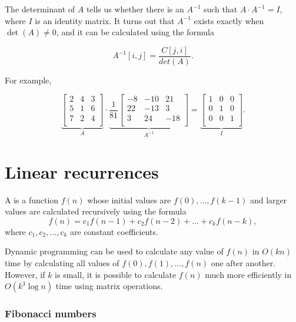 
The determinant of $A$ tells us
whether there is an 
$A^{-1}$ such that $A \cdot A^{-1} = I$,
where $I$ is an identity matrix.
It turns out that $A^{-1}$ exists
exactly when $\det(A) \neq 0$,
and it can be calculated using the formula

\[A^{-1}[i,j] = \frac{C[j,i]}{det(A)}.\]

For example,

\[
    \underbrace{
        \begin{bmatrix}
            2 & 4 & 3 \\
            5 & 1 & 6 \\
            7 & 2 & 4 \\
        \end{bmatrix}
    }_{A}
    \cdot
    \underbrace{
        \frac{1}{81}
        \begin{bmatrix}
            -8 & -10 & 21  \\
            22 & -13 & 3   \\
            3  & 24  & -18 \\
        \end{bmatrix}
    }_{A^{-1}}
    =
    \underbrace{
        \begin{bmatrix}
            1 & 0 & 0 \\
            0 & 1 & 0 \\
            0 & 0 & 1 \\
        \end{bmatrix}
    }_{I}.
\]

\section{Linear recurrences}


A 
is a function $f(n)$
whose initial values are
$f(0),\ldots,f(k-1)$
and larger values
are calculated recursively using the formula
\[f(n) = c_1 f(n-1) + c_2 f(n-2) + \ldots + c_k f (n-k),\]
where $c_1,c_2,\ldots,c_k$ are constant coefficients.

Dynamic programming can be used to calculate
any value of $f(n)$ in $O(kn)$ time by calculating
all values of $f(0),f(1),\ldots,f(n)$ one after another.
However, if $k$ is small, it is possible to calculate
$f(n)$ much more efficiently in $O(k^3 \log n)$
time using matrix operations.

\subsubsection{Fibonacci numbers}

